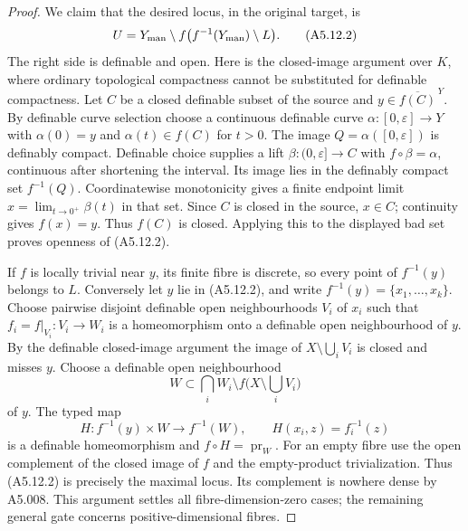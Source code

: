 \begin{proof}
We claim that the desired locus, in the original target, is
\[
 U=Y_{\rm man}\setminus f\bigl(f^{-1}(Y_{\rm man})\setminus L\bigr).
                                                               \tag{A5.12.2}
\]
The right side is definable and open. Here is the closed-image
argument over $K$, where ordinary topological compactness cannot
be substituted for definable compactness. Let $C$ be a closed
definable subset of the source and $y\in\overline{f(C)}^{\,Y}$.
By definable curve selection choose a continuous definable curve
$\alpha:[0,\varepsilon]\to Y$ with $\alpha(0)=y$ and
$\alpha(t)\in f(C)$ for $t>0$. The image
$Q=\alpha([0,\varepsilon])$ is definably compact.
Definable choice supplies a lift $\beta:(0,\varepsilon]\to C$
with $f\circ\beta=\alpha$, continuous after shortening the
interval. Its image lies in the definably compact set $f^{-1}(Q)$.
Coordinatewise monotonicity gives a finite endpoint limit
$x=\lim_{t\to0^+}\beta(t)$ in that set. Since $C$ is closed
in the source, $x\in C$; continuity gives $f(x)=y$.
Thus $f(C)$ is closed. Applying this to the displayed bad set
proves openness of (A5.12.2).

If $f$ is locally trivial near $y$, its finite fibre is discrete,
so every point of $f^{-1}(y)$ belongs to $L$.
Conversely let $y$ lie in (A5.12.2), and write
$f^{-1}(y)=\{x_1,\ldots,x_k\}$. Choose pairwise disjoint definable
open neighbourhoods $V_i$ of $x_i$ such that
$f_i=f|_{V_i}:V_i\to W_i$ is a homeomorphism onto a definable
open neighbourhood of $y$. By the definable closed-image argument the image of
$X\setminus\bigcup_iV_i$ is closed and misses $y$.
Choose a definable open neighbourhood
\[
 W\subset\bigcap_iW_i\setminus
                  f\bigl(X\setminus\bigcup_iV_i\bigr)
\]
of $y$. The typed map
\[
 H:f^{-1}(y)\times W\longrightarrow f^{-1}(W),\qquad
                  H(x_i,z)=f_i^{-1}(z)
\]
is a definable homeomorphism and $f\circ H=\operatorname{pr}_W$.
For an empty fibre use the open complement of the closed image
of $f$ and the empty-product trivialization. Thus (A5.12.2)
is precisely the maximal locus. Its complement is nowhere dense
by A5.008. This argument settles all fibre-dimension-zero cases;
the remaining general gate concerns positive-dimensional fibres.
\end{proof}


